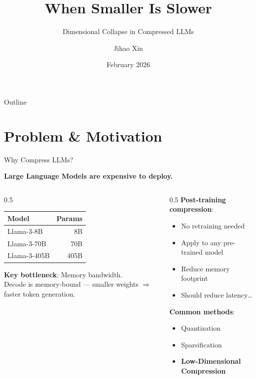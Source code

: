 \documentclass[aspectratio=169,10pt]{beamer}
\title{When Smaller Is Slower}
\subtitle{Dimensional Collapse in Compressed LLMs}
\author{Jihao Xin}
\institute{KAUST}
\date{February 2026}
\begin{document}
{
\begin{frame}
\titlepage
\end{frame}
}

\begin{frame}{Outline}
\tableofcontents
\end{frame}

\section{Problem \& Motivation}

\begin{frame}{Why Compress LLMs?}

\textbf{Large Language Models are expensive to deploy.}

\vspace{0.4cm}
\begin{columns}
\begin{column}{0.5\textwidth}
\begin{tabular}{lr}
\toprule
\textbf{Model} & \textbf{Params} \\
\midrule
Llama-3-8B & 8B \\
Llama-3-70B & 70B \\
Llama-3-405B & 405B \\
\bottomrule
\end{tabular}

\vspace{0.4cm}
\textbf{Key bottleneck}: Memory bandwidth.\\[0.2cm]
Decode is memory-bound --- smaller weights $\Rightarrow$ faster token generation.
\end{column}
\begin{column}{0.5\textwidth}
\textbf{Post-training compression}:\\[0.2cm]
\begin{itemize}
\item No retraining needed
\item Apply to any pre-trained model
\item Reduce memory footprint
\item Should reduce latency\ldots
\end{itemize}

\vspace{0.3cm}
\textbf{Common methods}:
\begin{itemize}
\item Quantization
\item Sparsification
\item \textbf{Low-Dimensional Compression}
\end{itemize}
\end{column}
\end{columns}
\end{frame}
\end{document}
